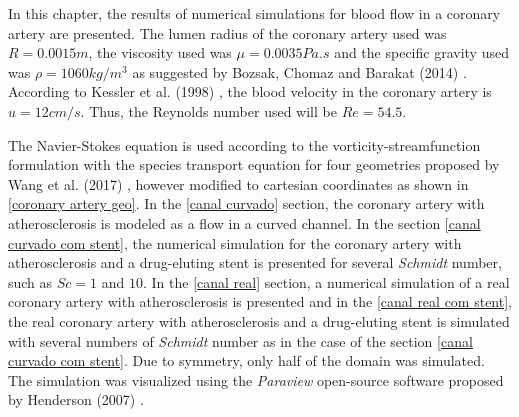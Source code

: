 In this chapter, the results of numerical simulations for 
blood flow in a coronary artery are presented. 
The lumen radius of the coronary artery used was $R=0.0015m$, 
the viscosity used was $\mu=0.0035Pa.s$ and the specific gravity used was
$\rho=1060kg/m^3$ as suggested by Bozsak, Chomaz and Barakat (2014)
 \cite{bozsak2014}. According to Kessler et al. (1998) 
\cite{kessler1998}, the blood velocity in the coronary artery 
is $u=12cm/s$. Thus, the Reynolds number used will be 
$Re=54.5$. 

\par 
The Navier-Stokes equation is used according to the 
vorticity-streamfunction formulation with 
the species transport equation for four geometries proposed 
by Wang et al. (2017) \cite{wang2017}, however modified to 
cartesian coordinates as shown in \ref{coronary artery geo}. 
In the \ref{canal curvado} section, the coronary artery 
with atherosclerosis is modeled as a flow in a curved channel. 
In the section \ref{canal curvado com stent}, the numerical 
simulation for the coronary artery with atherosclerosis 
and a drug-eluting stent is presented for several 
\textit{Schmidt} number, such as $Sc=1$ and $10$. 
In the \ref{canal real} section, a numerical simulation 
of a real coronary artery with atherosclerosis is presented 
and in the \ref{canal real com stent}, the real coronary 
artery with atherosclerosis and a drug-eluting stent is 
simulated with several numbers of \textit{Schmidt} number 
as in the case of the section \ref{canal curvado com stent}. 
Due to symmetry, only half of the domain was simulated. 
The simulation was visualized using the \textit{Paraview} open-source 
software proposed by Henderson (2007) \cite{paraview}.


